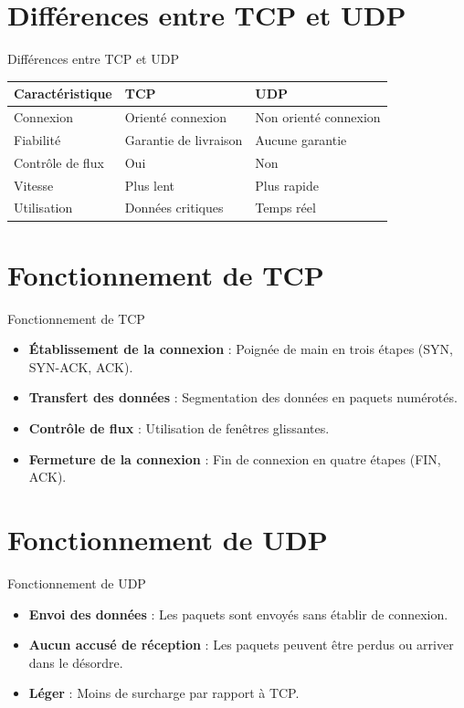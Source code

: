 \documentclass{clbeamer2024}
\begin{document}
\section{Différences entre TCP et UDP}
\begin{frame}{Différences entre TCP et UDP}
	\begin{table}
		\begin{tabular}{|l|l|l|}
			\hline
			\textbf{Caractéristique} & \textbf{TCP} & \textbf{UDP} \\
			\hline
			Connexion & Orienté connexion & Non orienté connexion \\
			Fiabilité & Garantie de livraison & Aucune garantie \\
			Contrôle de flux & Oui & Non \\
			Vitesse & Plus lent & Plus rapide \\
			Utilisation & Données critiques & Temps réel \\
			\hline
		\end{tabular}
	\end{table}
\end{frame}

\section{Fonctionnement de TCP}
\begin{frame}{Fonctionnement de TCP}
	\begin{itemize}
		\item \textbf{Établissement de la connexion} : Poignée de main en trois étapes (SYN, SYN-ACK, ACK).
		\item \textbf{Transfert des données} : Segmentation des données en paquets numérotés.
		\item \textbf{Contrôle de flux} : Utilisation de fenêtres glissantes.
		\item \textbf{Fermeture de la connexion} : Fin de connexion en quatre étapes (FIN, ACK).
	\end{itemize}
\end{frame}


\section{Fonctionnement de UDP}
\begin{frame}{Fonctionnement de UDP}
	\begin{itemize}
		\item \textbf{Envoi des données} : Les paquets sont envoyés sans établir de connexion.
		\item \textbf{Aucun accusé de réception} : Les paquets peuvent être perdus ou arriver dans le désordre.
		\item \textbf{Léger} : Moins de surcharge par rapport à TCP.
	\end{itemize}
\end{frame}
\end{document}
